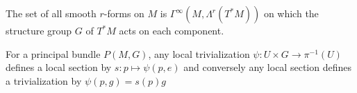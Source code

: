 		
		\begin{eg}
			The set of all smooth $r$-forms on $M$ is $\Gamma^\infty(M, \Lambda^r (T^* M))$ on which the structure group $G$ of $T^*M$ acts on each component. %
		\end{eg}
		
		\begin{prop}
			For a principal bundle $P(M,G)$, any local trivialization $\psi: U \times G \rightarrow \pi^{-1} (U)$ defines a local section by $s: p \mapsto \psi(p, e)$ and conversely any local section defines a trivialization by $\psi(p,g) = s(p) g$
		\end{prop}
		
		
